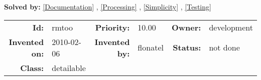 \textbf{Solved by:} \ref{Documentation} , \ref{Processing} , \ref{Simplicity} , \ref{Testing} 

\par
{\small \begin{center}\begin{tabular}{rlrlrl}
\textbf{Id:} & rmtoo  & \textbf{Priority:} & 10.00  & \textbf{Owner:} & development\\ 
\textbf{Invented on:} & 2010-02-06  & \textbf{Invented by:} & flonatel  & \textbf{Status:} & not done \\ 
\textbf{Class:} & detailable  & & & \end{tabular}\end{center} }

